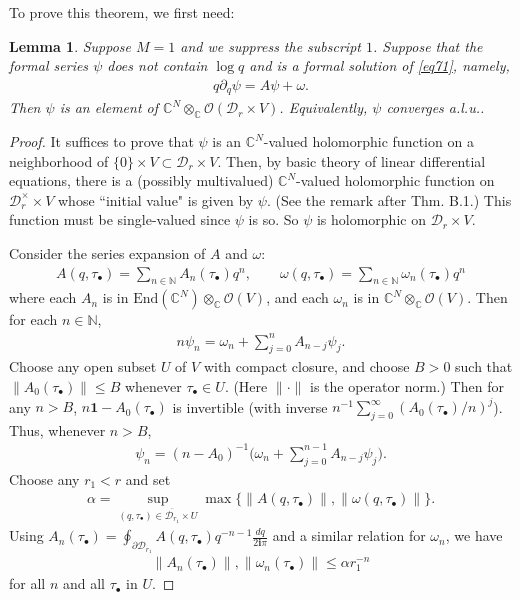 \documentclass[12pt,a4paper,notitlepage]{article}
\theoremstyle{definition}
\theoremstyle{plain}
\newtheorem{lm}[df]{Lemma}
\newcommand{\mc}{\mathcal}
\newcommand{\ovl}{\overline}
\newcommand{\End}{\mathrm{End}} %
\newcommand{\id}{\mathbf{1}}
\newcommand{\scr}{\mathscr}
\newcommand{\im}{\mathbf{i}}
\newcommand{\mbb}{\mathbb}
\newcommand{\blt}{\bullet}
\newcommand{\Cbb}{\mathbb C}
\newcommand{\Nbb}{\mathbb N}
\numberwithin{equation}{section}
\begin{document}
To prove this theorem, we first need:

\begin{lm}\label{lb59}
Suppose $M=1$ and we suppress the subscript $1$.  Suppose that the formal series $\psi$ does not contain $\log q$ and is a formal solution of \eqref{eq71}, namely,
\begin{align*}
q\partial_q \psi=A\psi+\omega.
\end{align*}
Then $\psi$ is an element of $\Cbb^N\otimes_\Cbb\scr O(\mc D_r\times V)$. Equivalently, $\psi$ converges a.l.u..
\end{lm}

\begin{proof}
It suffices to prove that $\psi$ is an $\Cbb^N$-valued holomorphic function on a neighborhood of $\{0\}\times V\subset\mc D_r\times V$. Then, by basic theory of linear differential equations, there is a (possibly multivalued) $\Cbb^N$-valued holomorphic function on $\mc D_r^\times\times V$ whose ``initial value" is given by $\psi$. (See \cite{Kna} the remark after Thm. B.1.) This function must be single-valued since $\psi$ is so. So $\psi$ is holomorphic on $\mc D_r\times V$.

Consider the series expansion of $A$ and $\omega$:
	\begin{align*}
	A(q,\tau_\blt)=\sum_{n\in\mbb N} A_n(\tau_\blt)q^n,\qquad \omega(q,\tau_\blt)=\sum_{n\in\Nbb}\omega_n(\tau_\blt)q^n
	\end{align*}
	where each $ A_n$ is  in $\End(\Cbb^N)\otimes_\Cbb\scr O(V)$, and each $\omega_n$ is in $\Cbb^N\otimes_\Cbb\scr O(V)$.  Then for each $n\in\mbb N$,
	\begin{align*}
	n\psi_n=\omega_n+\sum_{j=0}^n A_{n-j}\psi_j.
	\end{align*}
	Choose any open subset $U$ of $V$ with compact closure, and choose $B>0$ such that $\lVert A_0(\tau_\bullet)\lVert\leq B$ whenever $\tau_\blt\in U$. (Here $\lVert\cdot\lVert$ is the operator norm.) Then for any $n>B$, $n\id- A_0(\tau_\blt)$ is invertible (with inverse $n^{-1}\sum_{j=0}^\infty( A_0(\tau_\blt)/n)^j $). Thus, whenever $n>B$,
	\begin{align}
	\psi_n=(n- A_0)^{-1}\Big(\omega_n+\sum_{j=0}^{n-1} A_{n-j}\psi_j\Big).\label{eq73}
	\end{align}
	Choose any $r_1<r$ and set
	\begin{align}
	\alpha=\sup_{(q,\tau_\blt)\in {\ovl{\mc D_{r_1}}\times U}}\max\{\lVert A(q,\tau_\blt)\lVert,\lVert\omega(q,\tau_\blt)\lVert\}.\label{eq74}
	\end{align}
	Using $ A_n(\tau_\blt)=\oint_{\partial \mc D_{r_1}} A(q,\tau_\blt)q^{-n-1}\frac{dq}{2\im\pi}$ and a similar relation for $\omega_n$, we have
	\begin{align}
	\lVert A_n(\tau_\blt)\lVert,\lVert\omega_n(\tau_\blt)\lVert\leq \alpha r_1^{-n}\label{eq75}
	\end{align}
	for all $n$ and all  $\tau_\blt$ in $U$.


\end{proof}
\end{document}
